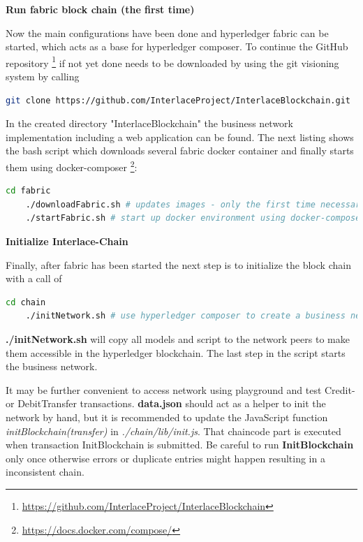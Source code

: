 \textbf{Run fabric block chain (the first time)}

Now the main configurations have been done and hyperledger fabric can be started, which acts as a base for hyperledger composer. To continue the GitHub repository \footnote{\url{https://github.com/InterlaceProject/InterlaceBlockchain}} if not yet done needs to be downloaded by using the git visioning system by calling

\begin{lstlisting}[language=bash]
	git clone https://github.com/InterlaceProject/InterlaceBlockchain.git
\end{lstlisting}

In the created directory "InterlaceBlockchain" the business network implementation including a web application can be found. The next listing shows the bash script which downloads several fabric docker container and finally starts them using docker-composer \footnote{\url{https://docs.docker.com/compose/}}:

\begin{lstlisting}[language=bash]
	cd fabric
	./downloadFabric.sh # updates images - only the first time necessary
	./startFabric.sh # start up docker environment using docker-compose
\end{lstlisting}

\textbf{Initialize Interlace-Chain}

Finally, after fabric has been started the next step is to initialize the block chain with a call of

\begin{lstlisting}[language=bash]
	cd chain
	./initNetwork.sh # use hyperledger composer to create a business network and deploy it
\end{lstlisting}

\textbf{./initNetwork.sh} will copy all models and script to the network peers to make them accessible in the hyperledger blockchain. The last step in the script starts the business network.

It may be further convenient to access network using playground and test Credit- or DebitTransfer transactions. \textbf{data.json} should act as a helper to init the network by hand, but it is recommended to update the JavaScript function \textit{initBlockchain(transfer)} in \textit{./chain/lib/init.js}. That chaincode part is executed when transaction InitBlockchain is submitted. Be careful to run \textbf{InitBlockchain} only once otherwise errors or duplicate entries might happen resulting in a inconsistent chain.

